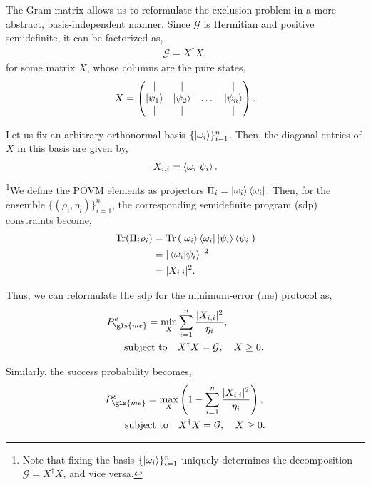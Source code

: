 \documentclass[12pt,letterpaper]{article}
\DeclareMathOperator{\tr}{Tr}
\begin{document}
\begin{multicols}{2}
The Gram matrix allows us to reformulate the exclusion problem in a more abstract, basis-independent manner. Since $\mathcal{G}$ is Hermitian and positive semidefinite, it can be factorized as,
\begin{align*}
	\mathcal{G} = X^\dagger X,
\end{align*}
for some matrix $X$, whose columns are the pure states,
\begin{align*}
	X = \begin{pmatrix}
		\mid & \mid &        & \mid \\
		\ket{\psi_1} & \ket{\psi_2} & \dots & \ket{\psi_n} \\
		\mid & \mid &        & \mid
	\end{pmatrix}.
\end{align*}

Let us fix an arbitrary orthonormal basis $\{\ket{\omega_i}\}_{i=1}^n$. Then, the diagonal entries of $X$ in this basis are given by,
\begin{align*}
	X_{i,i} = \braket{\omega_i|\psi_i}.
\end{align*}
\footnote{Note that fixing the basis $\{\ket{\omega_i}\}_{i=1}^n$ uniquely determines the decomposition $\mathcal{G} = X^\dagger X$, and vice versa.}We define the POVM elements as projectors $\Pi_i = \ket{\omega_i}\bra{\omega_i}$. Then, for the ensemble $\{(\rho_i, \eta_i)\}_{i=1}^n$, the corresponding semidefinite program (\gls{sdp}) constraints become,
\begin{align*}
	\tr(\Pi_i \rho_i) &= \tr\left( \ket{\omega_i}\bra{\omega_i} \ket{\psi_i}\bra{\psi_i} \right) \\
	&= |\braket{\omega_i|\psi_i}|^2 \\
	&= |X_{i,i}|^2.
\end{align*}

Thus, we can reformulate the \gls{sdp} for the minimum-error (\gls{me}) protocol as,
\begin{align*}
	P_{\gls{me}}^e = \min_{X} &\sum_{i=1}^n \frac{|X_{i,i}|^2}{\eta_i}, \\
	\text{subject to} \quad & X^\dagger X = \mathcal{G}, \quad X \geq 0.
\end{align*}

Similarly, the success probability becomes,
\begin{align*}
	P_{\gls{me}}^s = \max_{X} &\left( 1 - \sum_{i=1}^n \frac{|X_{i,i}|^2}{\eta_i} \right), \\
	\text{subject to} \quad & X^\dagger X = \mathcal{G}, \quad X \geq 0.
\end{align*}


\end{multicols}
\end{document}
